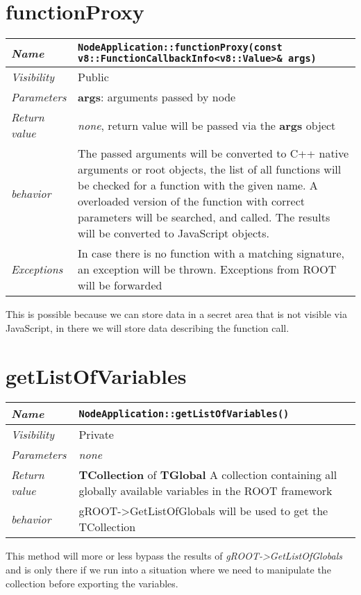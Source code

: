 \section{functionProxy}
\begin{longtable}{p{3cm} @{\hskip 1cm} p{12cm}}
  \hline
  \textit{Name} & \texttt{NodeApplication::functionProxy(const v8::FunctionCallbackInfo<v8::Value>\& args)} \\
  \hline
  \textit{Visibility} & Public \\
  \hline
  \textit{Parameters} & \textbf{args}: arguments passed by node \\
  \hline
  \textit{Return value} & \textit{none}, return value will be passed via the \textbf{args} object \\
  \hline
  \textit{behavior} & The passed arguments will be converted to C++ native arguments or root objects, the list of all functions will be checked for a function with the given name.
  A overloaded version of the function with correct parameters will be searched, and called. The results will be converted to JavaScript objects. \\
  \hline
  \textit{Exceptions} & In case there is no function with a matching signature, an exception will be thrown.
  Exceptions from ROOT will be forwarded \\
  \hline
\end{longtable}
This is possible because we can store data in a secret area that is not visible via JavaScript, in there we will store data describing the function call.
\newpage
\section{getListOfVariables}
\begin{longtable}{p{3cm} @{\hskip 1cm} p{12cm}}
  \hline
  \textit{Name} & \texttt{NodeApplication::getListOfVariables()} \\
  \hline
  \textit{Visibility} & Private \\
  \hline
  \textit{Parameters} & \textit{none} \\
  \hline
  \textit{Return value} & \textbf{TCollection} of \textbf{TGlobal} A collection containing all globally available variables in the ROOT framework \\
  \hline
  \textit{behavior} & gROOT->GetListOfGlobals will be used to get the TCollection \\
  \hline
\end{longtable}
This method will more or less bypass the results of \textit{gROOT->GetListOfGlobals} and is only there if we run into a situation where we need to manipulate the collection before exporting the variables.
\newpage
